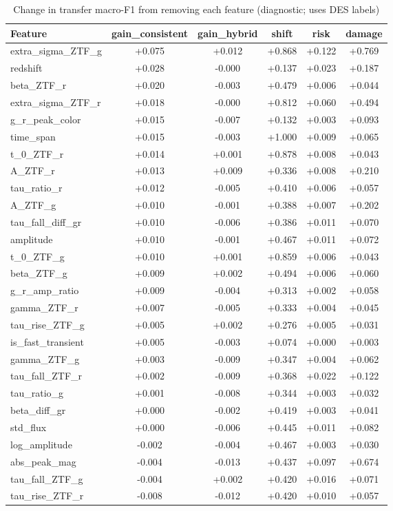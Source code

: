 \begin{table}
\centering
\caption{Change in transfer macro-F1 from removing each feature (diagnostic; uses DES labels)}
\begin{tabular}{lccccc}
\hline
Feature & gain\_consistent & gain\_hybrid & shift & risk & damage \\
\hline
extra\_sigma\_ZTF\_g & +0.075 & +0.012 & +0.868 & +0.122 & +0.769 \\
redshift & +0.028 & -0.000 & +0.137 & +0.023 & +0.187 \\
beta\_ZTF\_r & +0.020 & -0.003 & +0.479 & +0.006 & +0.044 \\
extra\_sigma\_ZTF\_r & +0.018 & -0.000 & +0.812 & +0.060 & +0.494 \\
g\_r\_peak\_color & +0.015 & -0.007 & +0.132 & +0.003 & +0.093 \\
time\_span & +0.015 & -0.003 & +1.000 & +0.009 & +0.065 \\
t\_0\_ZTF\_r & +0.014 & +0.001 & +0.878 & +0.008 & +0.043 \\
A\_ZTF\_r & +0.013 & +0.009 & +0.336 & +0.008 & +0.210 \\
tau\_ratio\_r & +0.012 & -0.005 & +0.410 & +0.006 & +0.057 \\
A\_ZTF\_g & +0.010 & -0.001 & +0.388 & +0.007 & +0.202 \\
tau\_fall\_diff\_gr & +0.010 & -0.006 & +0.386 & +0.011 & +0.070 \\
amplitude & +0.010 & -0.001 & +0.467 & +0.011 & +0.072 \\
t\_0\_ZTF\_g & +0.010 & +0.001 & +0.859 & +0.006 & +0.043 \\
beta\_ZTF\_g & +0.009 & +0.002 & +0.494 & +0.006 & +0.060 \\
g\_r\_amp\_ratio & +0.009 & -0.004 & +0.313 & +0.002 & +0.058 \\
gamma\_ZTF\_r & +0.007 & -0.005 & +0.333 & +0.004 & +0.045 \\
tau\_rise\_ZTF\_g & +0.005 & +0.002 & +0.276 & +0.005 & +0.031 \\
is\_fast\_transient & +0.005 & -0.003 & +0.074 & +0.000 & +0.003 \\
gamma\_ZTF\_g & +0.003 & -0.009 & +0.347 & +0.004 & +0.062 \\
tau\_fall\_ZTF\_r & +0.002 & -0.009 & +0.368 & +0.022 & +0.122 \\
tau\_ratio\_g & +0.001 & -0.008 & +0.344 & +0.003 & +0.032 \\
beta\_diff\_gr & +0.000 & -0.002 & +0.419 & +0.003 & +0.041 \\
std\_flux & +0.000 & -0.006 & +0.445 & +0.011 & +0.082 \\
log\_amplitude & -0.002 & -0.004 & +0.467 & +0.003 & +0.030 \\
abs\_peak\_mag & -0.004 & -0.013 & +0.437 & +0.097 & +0.674 \\
tau\_fall\_ZTF\_g & -0.004 & +0.002 & +0.420 & +0.016 & +0.071 \\
tau\_rise\_ZTF\_r & -0.008 & -0.012 & +0.420 & +0.010 & +0.057 \\
\hline
\end{tabular}
\end{table}
